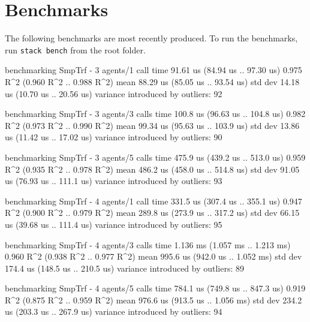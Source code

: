 \section{Benchmarks}\label{app:Benchmarks}

The following benchmarks are most recently produced.
To run the benchmarks, run \texttt{stack bench} from the root folder.

\begin{showCode}
benchmarking SmpTrf - 3 agents/1 call
time                 91.61 us   (84.94 us .. 97.30 us)
                     0.975 R^2   (0.960 R^2 .. 0.988 R^2)
mean                 88.29 us   (85.05 us .. 93.54 us)
std dev              14.18 us   (10.70 us .. 20.56 us)
variance introduced by outliers: 92%

benchmarking SmpTrf - 3 agents/3 calls
time                 100.8 us   (96.63 us .. 104.8 us)
                     0.982 R^2   (0.973 R^2 .. 0.990 R^2)
mean                 99.34 us   (95.63 us .. 103.9 us)
std dev              13.86 us   (11.42 us .. 17.02 us)
variance introduced by outliers: 90%

benchmarking SmpTrf - 3 agents/5 calls
time                 475.9 us   (439.2 us .. 513.0 us)
                     0.959 R^2   (0.935 R^2 .. 0.978 R^2)
mean                 486.2 us   (458.0 us .. 514.8 us)
std dev              91.05 us   (76.93 us .. 111.1 us)
variance introduced by outliers: 93%

benchmarking SmpTrf - 4 agents/1 call
time                 331.5 us   (307.4 us .. 355.1 us)
                     0.947 R^2   (0.900 R^2 .. 0.979 R^2)
mean                 289.8 us   (273.9 us .. 317.2 us)
std dev              66.15 us   (39.68 us .. 111.4 us)
variance introduced by outliers: 95%

benchmarking SmpTrf - 4 agents/3 calls
time                 1.136 ms   (1.057 ms .. 1.213 ms)
                     0.960 R^2   (0.938 R^2 .. 0.977 R^2)
mean                 995.6 us   (942.0 us .. 1.052 ms)
std dev              174.4 us   (148.5 us .. 210.5 us)
variance introduced by outliers: 89%

benchmarking SmpTrf - 4 agents/5 calls
time                 784.1 us   (749.8 us .. 847.3 us)
                     0.919 R^2   (0.875 R^2 .. 0.959 R^2)
mean                 976.6 us   (913.5 us .. 1.056 ms)
std dev              234.2 us   (203.3 us .. 267.9 us)
variance introduced by outliers: 94%


\end{showCode}
